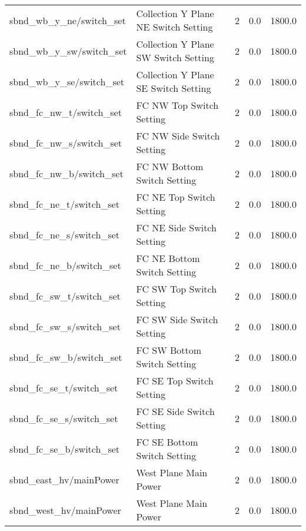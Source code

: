 \begin{center}
\begin{longtable}{l | l l l l }
sbnd\_wb\_y\_ne/switch\_set & Collection Y Plane NE Switch Setting & 2 & 0.0 & 1800.0\\ 
sbnd\_wb\_y\_sw/switch\_set & Collection Y Plane SW Switch Setting & 2 & 0.0 & 1800.0\\ 
sbnd\_wb\_y\_se/switch\_set & Collection Y Plane SE Switch Setting & 2 & 0.0 & 1800.0\\ 
sbnd\_fc\_nw\_t/switch\_set & FC NW Top Switch Setting & 2 & 0.0 & 1800.0\\ 
sbnd\_fc\_nw\_s/switch\_set & FC NW Side Switch Setting & 2 & 0.0 & 1800.0\\ 
sbnd\_fc\_nw\_b/switch\_set & FC NW Bottom Switch Setting & 2 & 0.0 & 1800.0\\ 
sbnd\_fc\_ne\_t/switch\_set & FC NE Top Switch Setting & 2 & 0.0 & 1800.0\\ 
sbnd\_fc\_ne\_s/switch\_set & FC NE Side Switch Setting & 2 & 0.0 & 1800.0\\ 
sbnd\_fc\_ne\_b/switch\_set & FC NE Bottom Switch Setting & 2 & 0.0 & 1800.0\\ 
sbnd\_fc\_sw\_t/switch\_set & FC SW Top Switch Setting & 2 & 0.0 & 1800.0\\ 
sbnd\_fc\_sw\_s/switch\_set & FC SW Side Switch Setting & 2 & 0.0 & 1800.0\\ 
sbnd\_fc\_sw\_b/switch\_set & FC SW Bottom Switch Setting & 2 & 0.0 & 1800.0\\ 
sbnd\_fc\_se\_t/switch\_set & FC SE Top Switch Setting & 2 & 0.0 & 1800.0\\ 
sbnd\_fc\_se\_s/switch\_set & FC SE Side Switch Setting & 2 & 0.0 & 1800.0\\ 
sbnd\_fc\_se\_b/switch\_set & FC SE Bottom Switch Setting & 2 & 0.0 & 1800.0\\ 
sbnd\_east\_hv/mainPower & West Plane Main Power & 2 & 0.0 & 1800.0\\ 
sbnd\_west\_hv/mainPower & West Plane Main Power & 2 & 0.0 & 1800.0\\ 

\hline
\end{longtable}
\end{center}


